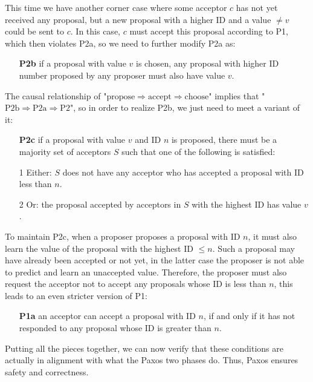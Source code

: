 \documentclass[11pt]{article}
\begin{document}
    This time we have another corner case where some acceptor $c$ has not yet received any proposal, but a new proposal with a higher \small{ID} \normalsize and a value $\neq v$ could be sent to $c$. In this case, $c$ must accept this proposal according to P1, which then violates P2a, so we need to further modify P2a as:
    \begin{itemize}
      \item[\textbf{P2b}] if a proposal with value $v$ is chosen, any proposal with higher \small{ID} \normalsize number proposed by any proposer must also have value $v$.
    \end{itemize}
    The causal relationship of "$\text{propose}\Rightarrow\text{accept}\Rightarrow\text{choose}$" implies that "$\text{P2b}\Rightarrow\text{P2a}\Rightarrow\text{P2}$", so in order to realize P2b, we just need to meet a variant of it:
    \begin{itemize}
      \item[\textbf{P2c}] if a proposal with value $v$ and \small{ID} \normalsize $n$ is proposed, there must be a majority set of acceptors $S$ such that one of the following is satisfied:
      \item[1] Either: $S$ does not have any acceptor who has accepted a proposal with \small{ID} \normalsize less than $n$.
      \item[2] Or: the proposal accepted by acceptors in $S$ with the highest \small{ID} \normalsize has value $v$.
    \end{itemize}
    To maintain P2c, when a proposer proposes a proposal with \small{ID} \normalsize $n$, it must also learn the value of the proposal with the highest \small{ID} \normalsize $\le n$. Such a proposal may have already been accepted or not yet, in the latter case the proposer is not able to predict and learn an unaccepted value. Therefore, the proposer must also request the acceptor not to accept any proposals whose \small{ID} \normalsize is less than $n$, this leads to an even stricter version of P1:
    \begin{itemize}
      \item[\textbf{P1a}] an acceptor can accept a proposal with \small{ID} \normalsize $n$, if and only if it has not responded to any proposal whose \small{ID} \normalsize is greater than $n$.
    \end{itemize}
    Putting all the pieces together, we can now verify that these conditions are actually in alignment with what the Paxos two phases do. Thus, Paxos ensures safety and correctness.
\end{document}
